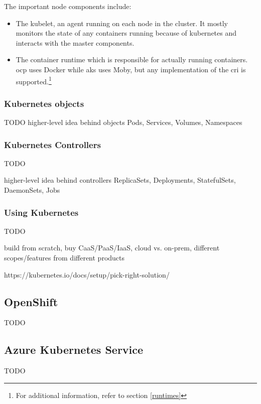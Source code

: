 The important node components include:
\begin{itemize}

\item The kubelet, an agent running on each node in the cluster. It mostly monitors the state of any containers running because of kubernetes and interacts with the master components.

\item The container runtime which is responsible for actually running containers. \gls{ocp} uses Docker while \gls{aks} uses Moby, but any implementation of the \gls{cri} is supported.\footnote{For additional information, refer to section \ref{runtimes}} 

\end{itemize}


\subsubsection{Kubernetes objects}
TODO
higher-level idea behind objects
Pods, Services, Volumes, Namespaces

\subsubsection{Kubernetes Controllers}
TODO

higher-level idea behind controllers
ReplicaSets, Deployments, StatefulSets, DaemonSets, Jobs

\subsubsection{Using Kubernetes}
TODO

build from scratch, buy CaaS/PaaS/IaaS, cloud vs. on-prem, different scopes/features from different products

https://kubernetes.io/docs/setup/pick-right-solution/

\subsection{OpenShift} \label{openshiftExplanation}
TODO

\subsection{Azure Kubernetes Service}
TODO

